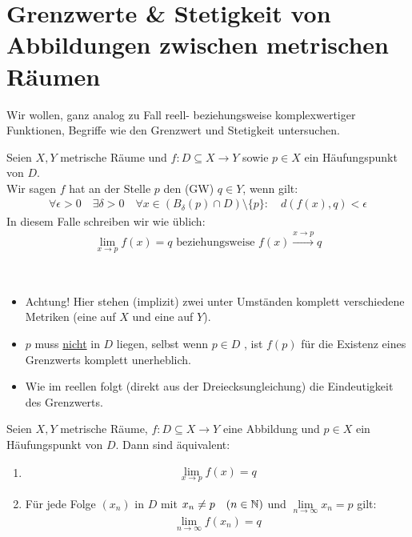 \section{Grenzwerte \& Stetigkeit von Abbildungen zwischen metrischen Räumen}

Wir wollen, ganz analog zu Fall reell- beziehungsweise komplexwertiger Funktionen, 
Begriffe wie den Grenzwert und Stetigkeit untersuchen.

\begin{Definition}{%
	Seien $X,Y$ metrische Räume und $f: D \subseteq X \rightarrow Y$ sowie $p \in 
	X$ ein Häufungspunkt von $D$.\\
	Wir sagen $f$ hat an der Stelle $p$ den  (GW) $q \in Y$, wenn 
	gilt:
	\begin{align*}
		\forall \epsilon > 0 \quad \exists \delta > 0  \quad \forall x 
		\in (B_\delta(p) \cap D) \setminus \{p\}: \quad d(f(x), q) < \epsilon
	\end{align*}
	In diesem Falle schreiben wir wie üblich:
	\begin{align*}
		\lim\limits_{x \rightarrow p}{f(x)} = q \text{ beziehungsweise } 
		f(x) \xrightarrow{x \rightarrow p}q
	\end{align*}
}\end{Definition}

\begin{Bemerkung}{
	~\begin{itemize}
		\item Achtung! Hier stehen (implizit) zwei unter Umständen komplett 
		verschiedene Metriken (eine auf $X$ und eine auf $Y$).
		\item $p$ muss \underline{nicht} in $D$ liegen, selbst wenn $p \in D$ , ist 
		$f(p)$ für die Existenz eines Grenzwerts komplett unerheblich.
		\item Wie im reellen folgt (direkt aus der Dreiecksungleichung) die 
		Eindeutigkeit des Grenzwerts.
	\end{itemize}
}\end{Bemerkung}

\begin{Satz}{%
	Seien $X,Y$ metrische Räume, $f: D \subseteq X \rightarrow Y$ eine Abbildung 
	und $p \in X$ ein Häufungspunkt von $D$. Dann sind äquivalent:
	\begin{enumerate}
		\item \label{vl_24_stp_1} \begin{align*}
				\lim\limits_{x \rightarrow p}{f(x)} = q
			\end{align*}
		\item \label{vl_24_stp_2} Für jede Folge $(x_n)$ in $D$ mit $x_n \neq p 
		\quad (n \in \mathbb{N})$ und $\lim\limits_{n \rightarrow \infty}{x_n}=p$ gilt:
			\begin{align*}
				\lim\limits_{n \rightarrow \infty}{f(x_n)} = q
			\end{align*}
	\end{enumerate}
}\end{Satz}

